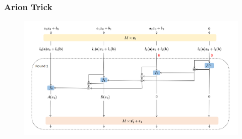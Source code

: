 \documentclass[aspectratio=169]{beamer}
\begin{document}
\begin{frame}
  \frametitle{Arion Trick}
  \begin{figure}
    \centering
    \includegraphics[height=.9\textheight]{./figures/arion-trick.png}
  \end{figure}
\end{frame}
\end{document}
